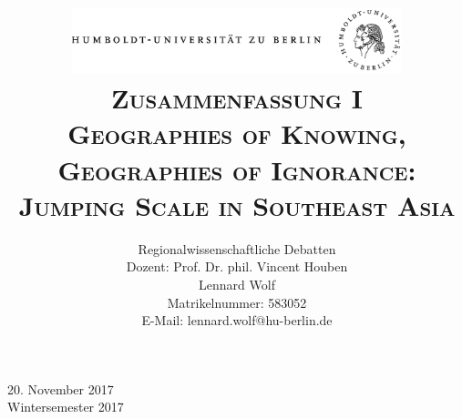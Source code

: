 \documentclass[a4paper, 12pt]{article}
\date{\vspace{-3ex}}
\begin{document}
\title{\vspace{5ex}
	\includegraphics*[bb=0 0 720 200, width=0.72\textwidth]{ErstesSem/images/hu_logo.png}\\
	\vspace{30pt}
	\scshape\LARGE{Zusammenfassung I}\\\Large{Geographies of Knowing, Geographies of Ignorance: Jumping Scale in Southeast Asia}\\\vspace{20pt}}
	


\author{Regionalwissenschaftliche Debatten\\
	\vspace{7pt}
          Dozent: Prof. Dr. phil. Vincent Houben\\\vspace{4pt}Lennard Wolf\\
        \small{Matrikelnummer: 583052}\\
        \small{E-Mail: lennard.wolf@hu-berlin.de}}


\maketitle

\vspace{\fill}

\begin{minipage}[]{0.92\textwidth}
    \centering
    \onehalfspacing
    \large   
    20. November 2017\\
    Wintersemester 2017

    \vspace{-20mm} 
\end{minipage}%
\thispagestyle{empty}
\newpage
\setcounter{page}{1}
\end{document}
